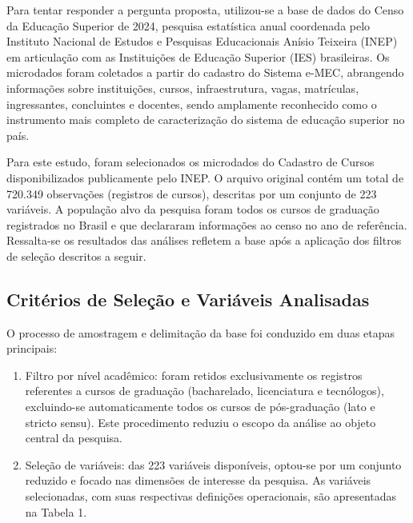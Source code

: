\documentclass[12pt]{article}
\begin{document}
Para tentar responder a pergunta proposta, utilizou-se a base de dados do Censo da Educação Superior de 2024, pesquisa estatística anual coordenada pelo Instituto Nacional de Estudos e Pesquisas Educacionais Anísio Teixeira (INEP) em articulação com as Instituições de Educação Superior (IES) brasileiras. Os microdados foram coletados a partir do cadastro do Sistema e-MEC, abrangendo informações sobre instituições, cursos, infraestrutura, vagas, matrículas, ingressantes, concluintes e docentes, sendo amplamente reconhecido como o instrumento mais completo de caracterização do sistema de educação superior no país.

Para este estudo, foram selecionados os microdados do Cadastro de Cursos disponibilizados publicamente pelo INEP. O arquivo original contém um total de 720.349 observações (registros de cursos), descritas por um conjunto de 223 variáveis. A população alvo da pesquisa foram todos os cursos de graduação registrados no Brasil e que declararam informações ao censo no ano de referência. Ressalta-se os resultados das análises refletem a base após a aplicação dos filtros de seleção descritos a seguir.

\subsection{Critérios de Seleção e Variáveis Analisadas}

O processo de amostragem e delimitação da base foi conduzido em duas etapas principais:

\begin{enumerate}
    \item Filtro por nível acadêmico: foram retidos exclusivamente os registros referentes a cursos de graduação (bacharelado, licenciatura e tecnólogos), excluindo-se automaticamente todos os cursos de pós-graduação (lato e stricto sensu). Este procedimento reduziu o escopo da análise ao objeto central da pesquisa.
    \item Seleção de variáveis: das 223 variáveis disponíveis, optou-se por um conjunto reduzido e focado nas dimensões de interesse da pesquisa. As variáveis selecionadas, com suas respectivas definições operacionais, são apresentadas na Tabela 1.
\end{enumerate}
\end{document}
